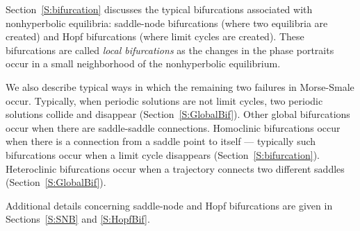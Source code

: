 \documentclass{ximera}
\begin{document}
Section~\ref{S:bifurcation} discusses the typical bifurcations associated 
with nonhyperbolic equilibria: saddle-node bifurcations (where two equilibria 
are created) and Hopf bifurcations (where limit cycles are created).  These 
bifurcations are called {\em local bifurcations\/} as the changes in the phase 
portraits occur in a small neighborhood of the nonhyperbolic equilibrium.  

We also describe typical ways in which the remaining two failures in 
Morse-Smale occur.  Typically, when periodic solutions are not limit cycles, 
two periodic solutions collide and disappear (Section~\ref{S:GlobalBif}).  
Other global bifurcations occur when there are saddle-saddle connections.  
Homoclinic bifurcations occur when there is a connection from a saddle point 
to itself --- typically such bifurcations occur when a limit cycle disappears
(Section~\ref{S:bifurcation}).   Heteroclinic bifurcations occur when a 
trajectory connects two different saddles (Section~\ref{S:GlobalBif}).

Additional details concerning saddle-node and Hopf bifurcations are given in 
Sections~\ref{S:SNB} and \ref{S:HopfBif}.
\end{document}
